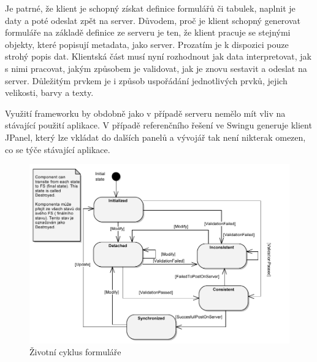 Je patrné, že klient je schopný získat definice formulářů či tabulek, naplnit je daty a poté odeslat zpět na server. Důvodem, proč je klient schopný generovat formuláře na základě definice ze serveru je ten, že klient pracuje se stejnými objekty, které popisují metadata, jako server. Prozatím je k dispozici pouze strohý popis dat. Klientská část musí nyní rozhodnout jak data interpretovat, jak s nimi pracovat, jakým způsobem je validovat, jak je znovu sestavit a odeslat na server. Důležitým prvkem je i způsob uspořádání jednotlivých prvků, jejich velikosti, barvy a texty.

Využití frameworku by obdobně jako v případě serveru nemělo mít vliv na stávající použití aplikace. V případě referenčního řešení ve Swingu generuje klient JPanel, který lze vkládat do dalších panelů a vývojář tak není nikterak omezen, co se týče stávající aplikace. 

\begin{figure}[h!]
\includegraphics{images/formLifecCycle}
\caption{Životní cyklus formuláře}
\label{img:formLifeCycle}
\end{figure}

